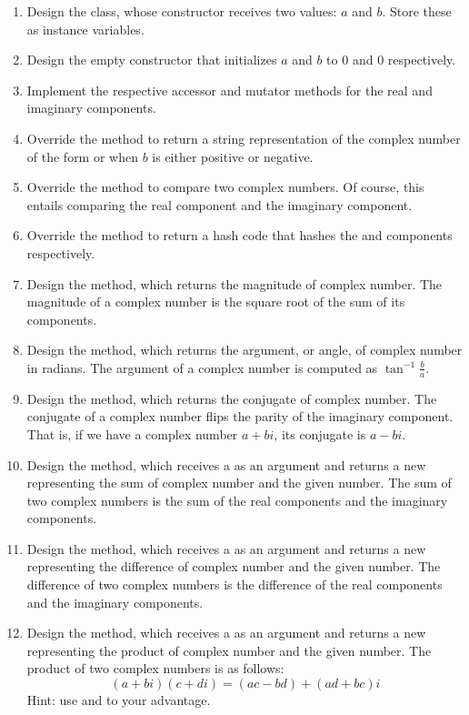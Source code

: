 \begin{enumerate}[label=(\alph*)]
    \item Design the  class, whose constructor receives two  values: $a$ and $b$. Store these as instance variables.
    \item Design the empty constructor that initializes $a$ and $b$ to $0$ and $0$ respectively. 
    \item Implement the respective accessor and mutator methods for the real and imaginary components.
    \item Override the  method to return a string representation of the complex number of the form  or  when $b$ is either positive or negative. 
    \item Override the  method to compare two complex numbers. Of course, this entails comparing the real component and the imaginary component.
    \item Override the  method to return a hash code that hashes the  and  components respectively.
    \item Design the  method, which returns the magnitude of  complex number. The magnitude of a complex number is the square root of the sum of its components.
    \item Design the  method, which returns the argument, or angle, of  complex number in radians. The argument of a complex number is computed as $\tan^{-1}{\frac{b}{a}}$.
    \item Design the  method, which returns the conjugate of  complex number. The conjugate of a complex number flips the parity of the imaginary component. That is, if we have a complex number $a + bi$, its conjugate is $a - bi$.
    \item Design the  method, which receives a  as an argument and returns a new  representing the sum of  complex number and the given number. The sum of two complex numbers is the sum of the real components and the imaginary components.
    \item Design the  method, which receives a  as an argument and returns a new  representing the difference of  complex number and the given number. The difference of two complex numbers is the difference of the real components and the imaginary components.
    \item Design the  method, which receives a  as an argument and returns a new  representing the product of  complex number and the given number. The product of two complex numbers is as follows:
    \[
        (a + bi)(c + di) = (ac - bd) + (ad + bc)i    
    \]
    Hint: use  and  to your advantage.
\end{enumerate}

